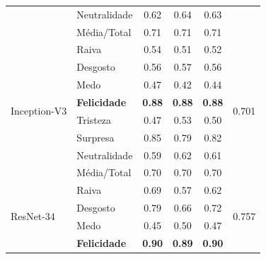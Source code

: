 \documentclass{beamer}
\begin{document}
\begin{frame}
\begin{table}[]
\begin{tabular}{llcccc}
                                    & Neutralidade          & 0.62              & 0.64               & 0.63              &                                 \\
                                    & Média/Total           & 0.71              & 0.71               & 0.71              &                                 \\ \hline
\multirow{8}{*}{Inception-V3}       & Raiva                 & 0.54              & 0.51               & 0.52              & \multirow{8}{*}{0.701}          \\
                                    & Desgosto              & 0.56              & 0.57               & 0.56              &                                 \\
                                    & Medo                  & 0.47              & 0.42               & 0.44              &                                 \\
                                    & \scriptsize \textbf{Felicidade}            & \scriptsize \textbf{0.88}              & \scriptsize \textbf{0.88}               & \scriptsize \textbf{0.88}              &                                 \\
                                    & Tristeza              & 0.47              & 0.53               & 0.50              &                                 \\
                                    & Surpresa              & 0.85              & 0.79               & 0.82              &                                 \\
                                    & Neutralidade          & 0.59              & 0.62               & 0.61              &                                 \\
                                    & Média/Total           & 0.70              & 0.70               & 0.70              &                                 \\ \hline
\multirow{8}{*}{ResNet-34} & Raiva        & 0.69     & 0.57      & 0.62     & \multirow{8}{*}{0.757} \\
                                    & Desgosto     & 0.79     & 0.66      & 0.72     &                                 \\
                                    & Medo         & 0.45     & 0.50      & 0.47     &                                 \\
                                    & \scriptsize \textbf{Felicidade}   & \scriptsize \textbf{0.90}     & \scriptsize \textbf{0.89}      & \scriptsize \textbf{0.90}     &                                 \\

\end{tabular}
\end{table}
\end{frame}
\end{document}
